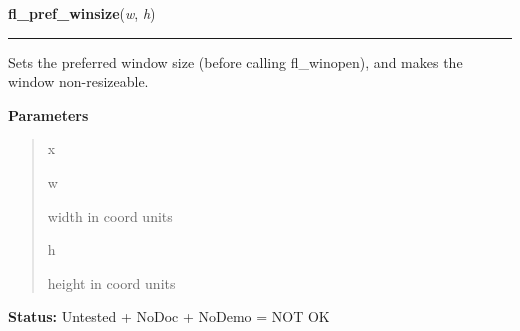     \label{xformslib:library:fl_winsize}

    \vspace{0.5ex}

\hspace{.8\funcindent}\begin{boxedminipage}{\funcwidth}

    \raggedright \textbf{fl\_pref\_winsize}(\textit{w}, \textit{h})

    \vspace{-1.5ex}

    \rule{\textwidth}{0.5\fboxrule}
\setlength{\parskip}{2ex}
    Sets the preferred window size (before calling fl\_winopen), and makes 
    the window non-resizeable.

\setlength{\parskip}{1ex}
      \textbf{Parameters}
      \vspace{-1ex}

      \begin{quote}
        \begin{Ventry}{x}

          \item[w]

          width in coord units

          \item[h]

          height in coord units

        \end{Ventry}

      \end{quote}

\textbf{Status:} Untested + NoDoc + NoDemo = NOT OK



    \end{boxedminipage}

    \label{xformslib:library:fl_initial_winsize}

    \vspace{0.5ex}

